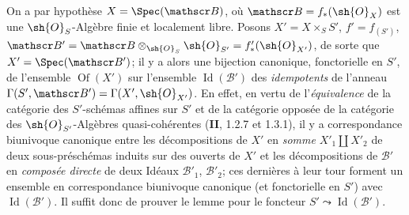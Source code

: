 
On a par hypothèse $X=\Spec(\mathscr B)$, où $\mathscr B=f_*(\sh{O}_X)$ est une $\sh{O}_S$-Algèbre finie et localement libre. Posons $X'=X\times_S S'$, $f'=f_{(S')}$, $\mathscr B'=\mathscr B\otimes_{\sh{O}_S}\sh{O}_{S'}=f'_*(\sh{O}_{X'})$, de sorte que $X'=\Spec(\mathscr B')$; il y a alors une bijection canonique, fonctorielle en $S'$, de l'ensemble $\operatorname{Of}(X')$ sur l'ensemble $\operatorname{Id}(\mathscr B')$ des \emph{idempotents} de l'anneau $\Gamma(S',\mathscr B')=\Gamma(X',\sh{O}_{X'})$. En effet, en vertu de l'\emph{équivalence} de la catégorie des $S'$-schémas affines sur $S'$ et de la catégorie opposée de la catégorie des $\sh{O}_{S'}$-Algèbres quasi-cohérentes (\textbf{II}, 1.2.7 et 1.3.1), il y a correspondance biunivoque canonique entre les décompositions de $X'$ en \emph{somme} $X'_1\amalg X'_2$ de deux sous-préschémas induits sur des ouverts de $X'$ et les décompositions de $\mathscr B'$ en \emph{composée directe} de deux Idéaux $\mathscr B'_1$, $\mathscr B'_2$; ces dernières à leur tour forment un ensemble en correspondance biunivoque canonique (et fonctorielle en $S'$) avec $\operatorname{Id}(\mathscr B')$. Il suffit donc de prouver le lemme pour le foncteur $S'\leadsto\operatorname{Id}(\mathscr B')$.

